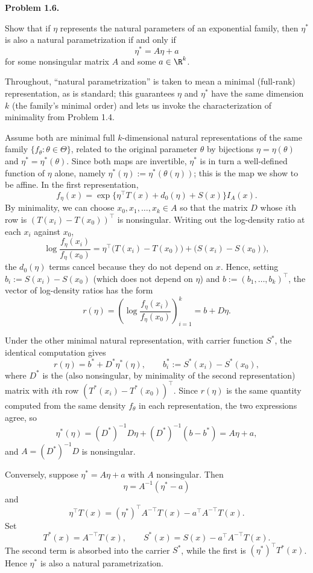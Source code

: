 \documentclass[answers,12pt,addpoints]{exam}
\begin{document}
\begin{questions}
\question[0] \textbf{Problem 1.6.}

Show that if $\eta$ represents the natural parameters of an exponential family, then
$\eta^*$ is also a natural parametrization if and only if
\[
\eta^*=A\eta+a
\]
for some nonsingular matrix $A$ and some $a\in\R^k$.

\begin{solution}
Throughout, ``natural parametrization'' is taken to mean a minimal
(full-rank) representation, as is standard; this guarantees $\eta$ and
$\eta^*$ have the same dimension $k$ (the family's minimal order) and lets
us invoke the characterization of minimality from Problem 1.4.

Assume both are minimal full $k$-dimensional natural representations of the same
family $\{f_\theta:\theta\in\Theta\}$, related to the original parameter $\theta$ by
bijections $\eta=\eta(\theta)$ and $\eta^*=\eta^*(\theta)$. Since both maps are
invertible, $\eta^*$ is in turn a well-defined function of $\eta$ alone, namely
$\eta^*(\eta):=\eta^*(\theta(\eta))$; this is the map we show to be affine. In the
first representation,
\[
f_\eta(x)
=
\exp\{\eta^\top T(x)+d_0(\eta)+S(x)\}I_A(x).
\]
By minimality, we can choose $x_0,x_1,\ldots,x_k\in A$ so that the matrix $D$ whose
$i$th row is $(T(x_i)-T(x_0))^\top$ is nonsingular. Writing out the log-density
ratio at each $x_i$ against $x_0$,
\[
\log\frac{f_\eta(x_i)}{f_\eta(x_0)}
=\eta^\top\bigl(T(x_i)-T(x_0)\bigr)+\bigl(S(x_i)-S(x_0)\bigr),
\]
the $d_0(\eta)$ terms cancel because they do not depend on $x$. Hence, setting
$b_i:=S(x_i)-S(x_0)$ (which does not depend on $\eta$) and
$b:=(b_1,\ldots,b_k)^\top$, the vector of log-density ratios has the form
\[
r(\eta)
=
\left(\log\frac{f_\eta(x_i)}{f_\eta(x_0)}\right)_{i=1}^k
=b+D\eta.
\]

Under the other minimal natural representation, with carrier function $S^*$, the
identical computation gives
\[
r(\eta)=b^*+D^*\eta^*(\eta),
\qquad
b^*_i:=S^*(x_i)-S^*(x_0),
\]
where $D^*$ is the (also nonsingular, by minimality of the second representation)
matrix with $i$th row $(T^*(x_i)-T^*(x_0))^\top$. Since $r(\eta)$ is the same
quantity computed from the same density $f_\theta$ in each representation, the two
expressions agree, so
\[
\eta^*(\eta)=(D^*)^{-1}D\eta+(D^*)^{-1}(b-b^*)=A\eta+a,
\]
and $A=(D^*)^{-1}D$ is nonsingular.

Conversely, suppose $\eta^*=A\eta+a$ with $A$ nonsingular. Then
\[
\eta=A^{-1}(\eta^*-a)
\]
and
\[
\eta^\top T(x)
=(\eta^*)^\top A^{-\top}T(x)-a^\top A^{-\top}T(x).
\]
Set
\[
T^*(x)=A^{-\top}T(x),
\qquad
S^*(x)=S(x)-a^\top A^{-\top}T(x).
\]
The second term is absorbed into the carrier $S^*$, while the first is
$(\eta^*)^\top T^*(x)$. Hence $\eta^*$ is also a natural parametrization.
\end{solution}


\end{questions}
\end{document}
